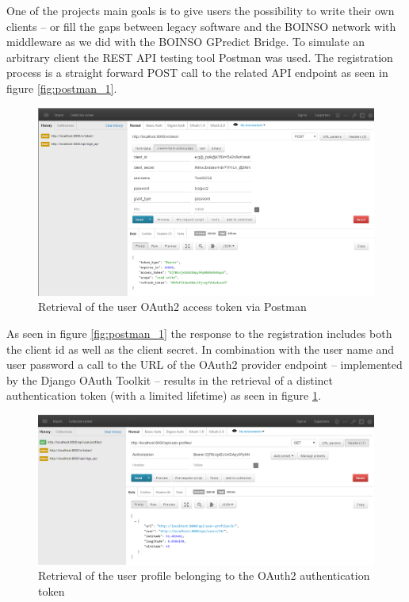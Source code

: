 \documentclass[BachelorPaper]{subfiles}
\begin{document}
One of the projects main goals is to give users the possibility to write their own clients -- or fill the gaps between legacy software and the BOINSO network with middleware as we did with the BOINSO GPredict Bridge. To simulate an arbitrary client the \ac{REST} \ac{API} testing tool Postman was used. The registration process is a straight forward POST call to the related \ac{API} endpoint as seen in figure \ref{fig:postman_1}. \\

\begin{figure}[!htbp]
\centering
\includegraphics[width=0.96\linewidth]{PICs/BacPics/results/postman_2.png}
\caption{Retrieval of the user OAuth2 access token via Postman}\label{fig:postman_2}
\end{figure}

As seen in figure \ref{fig:postman_1} the response to the registration includes both the client id as well as the client secret. In combination with the user name and user password a call to the \ac{URL} of the OAuth2 provider endpoint -- implemented by the Django OAuth Toolkit -- results in the retrieval of a distinct authentication token (with a limited lifetime) as seen in figure \ref{fig:postman_2}. \\

\begin{figure}[!htbp]
\centering
\includegraphics[width=0.96\linewidth]{PICs/BacPics/results/postman_3.png}
\caption{Retrieval of the user profile belonging to the OAuth2 authentication token}\label{fig:postman_3}
\end{figure}
\end{document}
